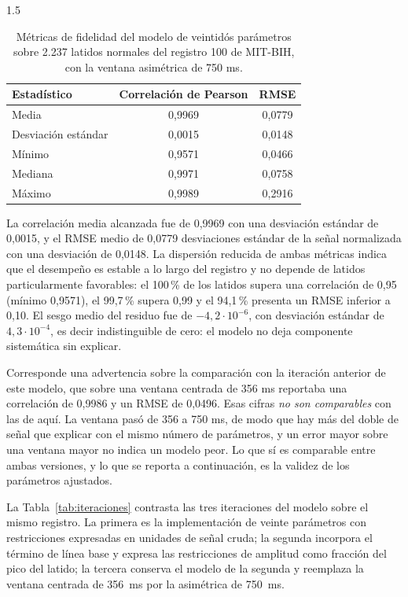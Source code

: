 \begin{spacing}{1.5}
\begin{table}[H]
\centering
\begin{tabular}{|l|c|c|}
\hline
\textbf{Estadístico} & \textbf{Correlación de Pearson} & \textbf{RMSE} \\ \hline
Media & 0,9969 & 0,0779 \\ \hline
Desviación estándar & 0,0015 & 0,0148 \\ \hline
Mínimo & 0,9571 & 0,0466 \\ \hline
Mediana & 0,9971 & 0,0758 \\ \hline
Máximo & 0,9989 & 0,2916 \\ \hline
\end{tabular}
\caption{Métricas de fidelidad del modelo de veintidós parámetros sobre 2.237 latidos normales del registro 100 de MIT-BIH, con la ventana asimétrica de 750 ms.}
\label{tab:metricas}
\end{table}

La correlación media alcanzada fue de 0,9969 con una desviación estándar de 0,0015, y el RMSE medio de 0,0779 desviaciones estándar de la señal normalizada con una desviación de 0,0148. La dispersión reducida de ambas métricas indica que el desempeño es estable a lo largo del registro y no depende de latidos particularmente favorables: el 100\,\% de los latidos supera una correlación de 0,95 (mínimo 0,9571), el 99,7\,\% supera 0,99 y el 94,1\,\% presenta un RMSE inferior a 0,10. El sesgo medio del residuo fue de $-4{,}2\cdot10^{-6}$, con desviación estándar de $4{,}3\cdot10^{-4}$, es decir indistinguible de cero: el modelo no deja componente sistemática sin explicar.

Corresponde una advertencia sobre la comparación con la iteración anterior de este modelo, que sobre una ventana centrada de 356 ms reportaba una correlación de 0,9986 y un RMSE de 0,0496. Esas cifras \emph{no son comparables} con las de aquí. La ventana pasó de 356 a 750 ms, de modo que hay más del doble de señal que explicar con el mismo número de parámetros, y un error mayor sobre una ventana mayor no indica un modelo peor. Lo que sí es comparable entre ambas versiones, y lo que se reporta a continuación, es la validez de los parámetros ajustados.

La Tabla~\ref{tab:iteraciones} contrasta las tres iteraciones del modelo sobre el mismo registro. La primera es la implementación de veinte parámetros con restricciones expresadas en unidades de señal cruda; la segunda incorpora el término de línea base y expresa las restricciones de amplitud como fracción del pico del latido; la tercera conserva el modelo de la segunda y reemplaza la ventana centrada de 356~ms por la asimétrica de 750~ms.


\end{spacing}
